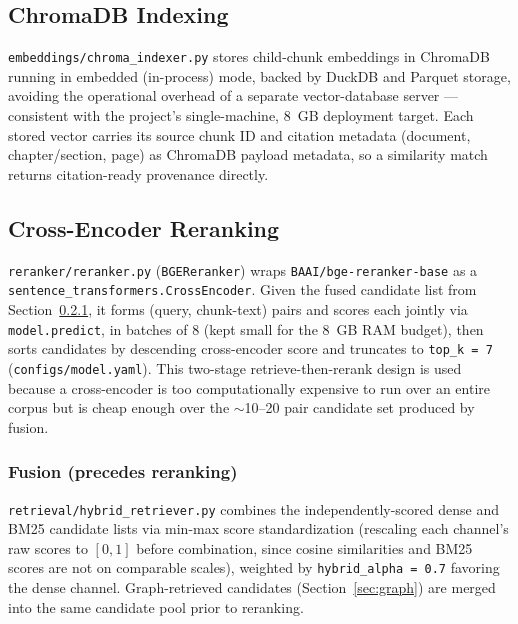 \documentclass[conference]{IEEEtran}
\begin{document}
\subsection{ChromaDB Indexing}
\texttt{embeddings/chroma\_indexer.py} stores child-chunk embeddings in ChromaDB running in embedded (in-process) mode, backed by DuckDB and Parquet storage, avoiding the operational overhead of a separate vector-database server — consistent with the project's single-machine, 8~GB deployment target. Each stored vector carries its source chunk ID and citation metadata (document, chapter/section, page) as ChromaDB payload metadata, so a similarity match returns citation-ready provenance directly.

\subsection{Cross-Encoder Reranking}
\texttt{reranker/reranker.py} (\texttt{BGEReranker}) wraps \texttt{BAAI/bge-reranker-base} as a \texttt{sentence\_transformers.CrossEncoder}. Given the fused candidate list from Section~\ref{sec:fusion}, it forms (query, chunk-text) pairs and scores each jointly via \texttt{model.predict}, in batches of 8 (kept small for the 8~GB RAM budget), then sorts candidates by descending cross-encoder score and truncates to \texttt{top\_k = 7} (\texttt{configs/model.yaml}). This two-stage retrieve-then-rerank design is used because a cross-encoder is too computationally expensive to run over an entire corpus but is cheap enough over the $\sim$10--20 pair candidate set produced by fusion.

\subsubsection{Fusion (precedes reranking)}
\label{sec:fusion}
\texttt{retrieval/hybrid\_retriever.py} combines the independently-scored dense and BM25 candidate lists via min-max score standardization (rescaling each channel's raw scores to $[0,1]$ before combination, since cosine similarities and BM25 scores are not on comparable scales), weighted by \texttt{hybrid\_alpha = 0.7} favoring the dense channel. Graph-retrieved candidates (Section~\ref{sec:graph}) are merged into the same candidate pool prior to reranking.
\end{document}
